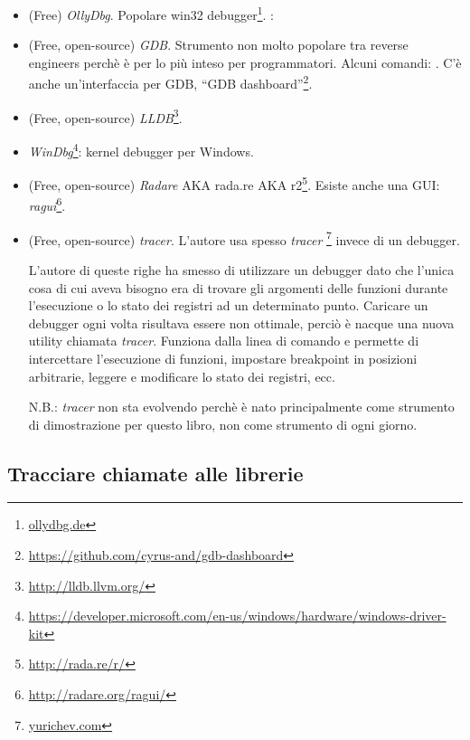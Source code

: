 \begin{itemize}
\item (Free) \emph{OllyDbg}.
Popolare win32 debugger\footnote{\href{http://go.yurichev.com/17032}{ollydbg.de}}.
\ShortHotKeyCheatsheet: 

\item (Free, open-source) \emph{GDB}.
Strumento non molto popolare tra reverse engineers perchè è per lo più inteso per programmatori.
Alcuni comandi: .
C'è anche un'interfaccia per GDB, ``GDB dashboard''\footnote{\url{https://github.com/cyrus-and/gdb-dashboard}}.

\item (Free, open-source) \emph{LLDB}\footnote{\url{http://lldb.llvm.org/}}.

\item \emph{WinDbg}\footnote{\url{https://developer.microsoft.com/en-us/windows/hardware/windows-driver-kit}}:
kernel debugger per Windows.

\item (Free, open-source) \emph{Radare} \ac{AKA} rada.re \ac{AKA} r2\footnote{\url{http://rada.re/r/}}.
Esiste anche una GUI: \emph{ragui}\footnote{\url{http://radare.org/ragui/}}.

\item (Free, open-source) \emph{tracer}.
\label{tracer}
L'autore usa spesso \emph{tracer}
\footnote{\href{http://go.yurichev.com/17338}{yurichev.com}}
invece di un debugger.

L'autore di queste righe ha smesso di utilizzare un debugger dato che l'unica cosa di cui aveva bisogno era di trovare gli
argomenti delle funzioni durante l'esecuzione o lo stato dei registri ad un determinato punto.
Caricare un debugger ogni volta risultava essere non ottimale, perciò è nacque una nuova utility chiamata \emph{tracer}.
Funziona dalla linea di comando e permette di intercettare l'esecuzione di funzioni,
impostare breakpoint in posizioni arbitrarie, leggere e modificare lo stato dei registri, ecc.

N.B.: \emph{tracer} non sta evolvendo perchè è nato principalmente come strumento di dimostrazione per questo libro, non come strumento di ogni giorno.
\end{itemize}

\subsection{Tracciare chiamate alle librerie}

